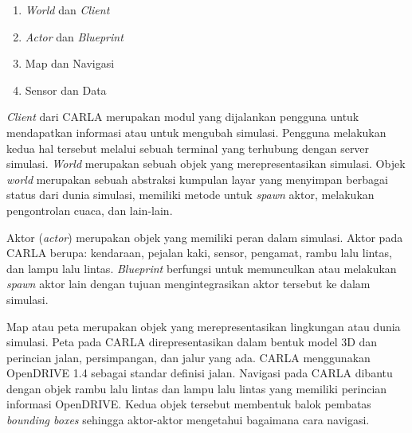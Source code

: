 \begin{enumerate}

    \item \textit{World} dan \textit{Client}
    \item \textit{Actor} dan \textit{Blueprint}
    \item Map dan Navigasi
    \item Sensor dan Data

\end{enumerate}


\textit{Client} dari CARLA merupakan modul yang dijalankan pengguna untuk
mendapatkan informasi atau untuk mengubah simulasi. Pengguna melakukan kedua hal
tersebut melalui sebuah terminal yang terhubung dengan server simulasi.
\textit{World} merupakan sebuah objek yang merepresentasikan simulasi. Objek
\textit{world} merupakan sebuah abstraksi kumpulan layar yang menyimpan berbagai
status dari dunia simulasi, memiliki metode untuk \textit{spawn} aktor,
melakukan pengontrolan cuaca, dan lain-lain.


Aktor (\textit{actor}) merupakan objek yang memiliki peran dalam simulasi. Aktor
pada CARLA berupa: kendaraan, pejalan kaki, sensor, pengamat, rambu lalu lintas,
dan lampu lalu lintas. \textit{Blueprint} berfungsi untuk memunculkan atau
melakukan \textit{spawn} aktor lain dengan tujuan mengintegrasikan aktor
tersebut ke dalam simulasi.


Map atau peta merupakan objek yang merepresentasikan lingkungan atau dunia
simulasi. Peta pada CARLA direpresentasikan dalam bentuk model 3D dan perincian
jalan, persimpangan, dan jalur yang ada. CARLA menggunakan OpenDRIVE 1.4 sebagai
standar definisi jalan. Navigasi pada CARLA dibantu dengan objek rambu lalu
lintas dan lampu lalu lintas yang memiliki perincian informasi OpenDRIVE. Kedua
objek tersebut membentuk balok pembatas \textit{bounding boxes} sehingga
aktor-aktor mengetahui bagaimana cara navigasi.

